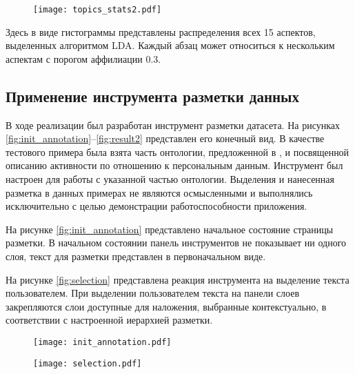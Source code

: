 \documentclass[../main]{subfiles}
\begin{document}
\begin{figure}[H]
    \centering
    {\texttt{[image: topics\_stats2.pdf]}}
    \vspace{-\baselineskip}
\end{figure}

Здесь в виде гистограммы представлены распределения всех 15 аспектов, выделенных алгоритмом LDA. Каждый абзац может относиться к нескольким аспектам с порогом аффилиации 0.3.

\subsection{Применение инструмента разметки данных}
\label{sec:real_proto}

В ходе реализации был разработан инструмент разметки датасета. На рисунках \ref{fig:init_annotation}--\ref{fig:result2} представлен его конечный вид. В качестве тестового примера была взята часть онтологии, предложенной в \cite{P2Onto}, и посвященной описанию активности по отношению к персональным данным. Инструмент был настроен для работы с указанной частью онтологии. Выделения и нанесенная разметка в данных примерах не являются осмысленными и выполнялись исключительно с целью демонстрации работоспособности приложения.

На рисунке \ref{fig:init_annotation} представлено начальное состояние страницы разметки. В начальном состоянии панель инструментов не показывает ни одного слоя, текст для разметки представлен в первоначальном виде.

На рисунке \ref{fig:selection} представлена реакция инструмента на выделение текста пользователем. При выделении пользователем текста на панели слоев закрепляются слои доступные для наложения, выбранные контекстуально, в соответствии с настроенной иерархией разметки.
\begin{figure}[H]
    \centering
    {\texttt{[image: init\_annotation.pdf]}}
    \vspace{-\baselineskip}
\end{figure}
\begin{figure}[H]
    \centering
    {\texttt{[image: selection.pdf]}}
    \vspace{-\baselineskip}
\end{figure}
\end{document}
